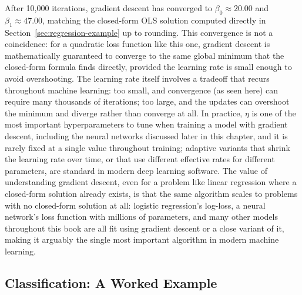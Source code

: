 \documentclass[../ai_in_finance]{subfiles}
\begin{document}
After 10,000 iterations, gradient descent has converged to $\beta_0 \approx 20.00$ and $\beta_1 \approx 47.00$, matching the closed-form OLS solution computed directly in Section~\ref{sec:regression-example} up to rounding. This convergence is not a coincidence: for a quadratic loss function like this one, gradient descent is mathematically guaranteed to converge to the same global minimum that the closed-form formula finds directly, provided the learning rate is small enough to avoid overshooting.
The learning rate itself involves a tradeoff that recurs throughout machine learning: too small, and convergence (as seen here) can require many thousands of iterations; too large, and the updates can overshoot the minimum and diverge rather than converge at all.
In practice, $\eta$ is one of the most important hyperparameters to tune when training a model with gradient descent, including the neural networks discussed later in this chapter, and it is rarely fixed at a single value throughout training; adaptive variants that shrink the learning rate over time, or that use different effective rates for different parameters, are standard in modern deep learning software.
The value of understanding gradient descent, even for a problem like linear regression where a closed-form solution already exists, is that the same algorithm scales to problems with no closed-form solution at all: logistic regression's log-loss, a neural network's loss function with millions of parameters, and many other models throughout this book are all fit using gradient descent or a close variant of it, making it arguably the single most important algorithm in modern machine learning.

\subsection{Classification: A Worked Example}
\label{sec:classification-example}
\end{document}
